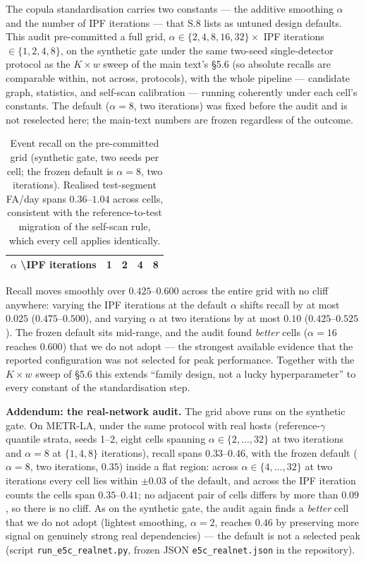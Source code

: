 \documentclass[11pt,a4paper]{article}
\begin{document}
The copula standardisation carries two constants --- the additive
smoothing $\alpha$ and the number of IPF iterations --- that S.8 lists
as untuned design defaults. This audit pre-committed a full grid,
$\alpha\in\{2,4,8,16,32\}\times$ IPF iterations $\in\{1,2,4,8\}$, on the
synthetic gate under the same two-seed single-detector protocol as the
$K\times w$ sweep of the main text's \S5.6 (so absolute recalls are
comparable within, not across, protocols), with the whole pipeline ---
candidate graph, statistics, and self-scan calibration --- running
coherently under each cell's constants. The default ($\alpha{=}8$, two
iterations) was fixed before the audit and is not reselected here; the
main-text numbers are frozen regardless of the outcome.

\begin{table}[h]\centering\small
\caption{Event recall on the pre-committed grid (synthetic gate, two
seeds per cell; the frozen default is $\alpha{=}8$, two iterations).
Realised test-segment FA/day spans $0.36$--$1.04$ across cells,
consistent with the reference-to-test migration of the self-scan rule,
which every cell applies identically.}
\label{tab:s13}
\begin{tabular}{@{}lcccc@{}}
\toprule
$\alpha$ \textbackslash IPF iterations & 1 & 2 & 4 & 8 \\
\midrule

\end{tabular}
\end{table}

Recall moves smoothly over $0.425$--$0.600$ across the entire grid with
no cliff anywhere: varying the IPF iterations at the default $\alpha$
shifts recall by at most $0.025$ ($0.475$--$0.500$), and varying
$\alpha$ at two iterations by at most $0.10$ ($0.425$--$0.525$). The
frozen default sits mid-range, and the audit found \emph{better} cells
($\alpha{=}16$ reaches $0.600$) that we do not adopt --- the strongest
available evidence that the reported configuration was not selected for
peak performance. Together with the $K\times w$ sweep of \S5.6 this
extends ``family design, not a lucky hyperparameter'' to every constant
of the standardisation step.

\medskip
\noindent\textbf{Addendum: the real-network audit.} The grid above runs
on the synthetic gate. On METR-LA, under the same protocol with real
hosts (reference-$\gamma$ quantile strata, seeds 1--2, eight cells
spanning $\alpha\in\{2,\dots,32\}$ at two iterations and
$\alpha{=}8$ at $\{1,4,8\}$ iterations), recall spans $0.33$--$0.46$,
with the frozen default ($\alpha{=}8$, two iterations, $0.35$) inside
a flat region: across $\alpha\in\{4,\dots,32\}$ at two iterations
every cell lies within $\pm 0.03$ of the default, and across the IPF
iteration counts the cells span $0.35$--$0.41$; no adjacent pair of
cells differs by more than $0.09$, so there is no cliff. As on the synthetic gate, the audit again finds a \emph{better}
cell that we do not adopt (lightest smoothing, $\alpha{=}2$, reaches
$0.46$ by preserving more signal on genuinely strong real dependencies)
--- the default is not a selected peak
(script \texttt{run\_e5c\_realnet.py}, frozen JSON
\texttt{e5c\_realnet.json} in the repository).
\end{document}
